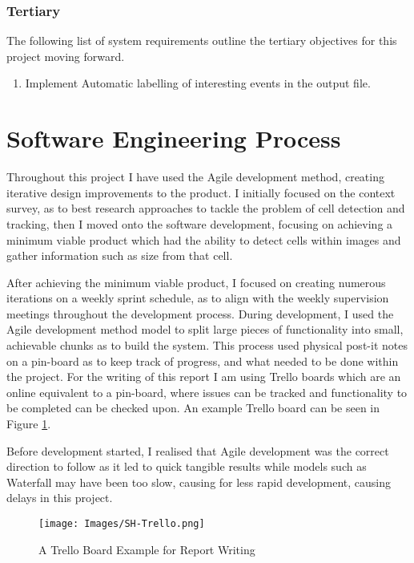 \documentclass[12pt a4paper]{article}
\begin{document}
\subsubsection{Tertiary}
The following list of system requirements outline the tertiary objectives for this project moving forward.
\begin{enumerate}
    \item Implement Automatic labelling of interesting events in the output file.
\end{enumerate}
\newpage
\section{Software Engineering Process}
Throughout this project I have used the Agile development method, creating iterative design improvements to the product. I initially focused on the context survey, as to best research approaches to tackle the problem of cell detection and tracking, then I moved onto the software development, focusing on achieving a minimum viable product which had the ability to detect cells within images and gather information such as size from that cell.

After achieving the minimum viable product, I focused on creating numerous iterations on a weekly sprint schedule, as to align with the weekly supervision meetings throughout the development process. During development, I used the Agile development method model to split large pieces of functionality into small, achievable chunks as to build the system. This process used physical post-it notes on a pin-board as to keep track of progress, and what needed to be done within the project. For the writing of this report I am using Trello boards which are an online equivalent to a pin-board, where issues can be tracked and functionality to be completed can be checked upon. An example Trello board can be seen in Figure \ref{fig:Trello}.

Before development started, I realised that Agile development was the correct direction to follow as it led to quick tangible results while models such as Waterfall may have been too slow, causing for less rapid development, causing delays in this project.
\begin{figure}
    \centering
    \texttt{[image: Images/SH-Trello.png]}
    \caption{A Trello Board Example for Report Writing}
    \label{fig:Trello}
\end{figure}
\end{document}
